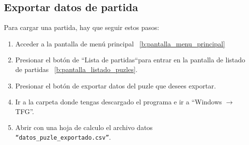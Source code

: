 \subsection{Exportar datos de partida}
Para cargar una partida, hay que seguir estos pasos:
\begin{enumerate}
    \item Acceder a la pantalla de menú principal ~\ref{b:pantalla_menu_principal}
    \item Presionar el botón de  ``Lista de partidas``para entrar en la pantalla de listado de partidas ~\ref{b:pantalla_listado_puzles}.
    \item Presionar el botón de exportar datos del puzle que desees exportar.
    \item Ir a la carpeta donde tengas descargado el programa e ir a ``Windows $\rightarrow$ TFG''.
    \item Abrir con una hoja de calculo el archivo datos \texttt{``datos\_puzle\_exportado.csv''}.
\end{enumerate}

